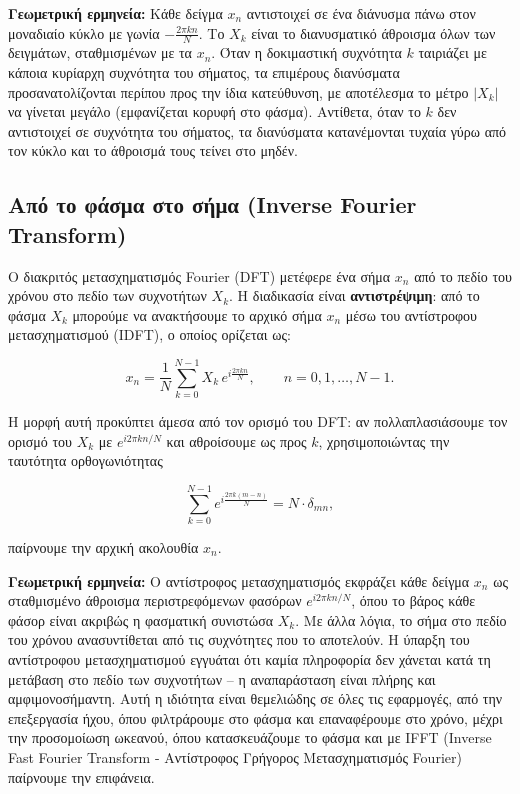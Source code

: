 \documentclass[a4paper, 11pt]{article}
\begin{document}
\textbf{Γεωμετρική ερμηνεία:} Κάθε δείγμα \(x_n\) αντιστοιχεί σε ένα
διάνυσμα πάνω στον μοναδιαίο κύκλο με γωνία \(-\frac{2\pi kn}{N}\). Το
\(X_k\) είναι το διανυσματικό άθροισμα όλων των δειγμάτων, σταθμισμένων
με τα \(x_n\). Όταν η δοκιμαστική συχνότητα \(k\) ταιριάζει με κάποια
κυρίαρχη συχνότητα του σήματος, τα επιμέρους διανύσματα
προσανατολίζονται περίπου προς την ίδια κατεύθυνση, με αποτέλεσμα το
μέτρο \(|X_k|\) να γίνεται μεγάλο (εμφανίζεται κορυφή στο φάσμα).
Αντίθετα, όταν το \(k\) δεν αντιστοιχεί σε συχνότητα του σήματος, τα
διανύσματα κατανέμονται τυχαία γύρω από τον κύκλο και το άθροισμά τους
τείνει στο μηδέν.

\subsection{Από το φάσμα στο σήμα (Inverse Fourier
Transform)}\label{ux3b1ux3c0ux3cc-ux3c4ux3bf-ux3c6ux3acux3c3ux3bcux3b1-ux3c3ux3c4ux3bf-ux3c3ux3aeux3bcux3b1-inverse-fourier-transform}

Ο διακριτός μετασχηματισμός Fourier (DFT) μετέφερε ένα σήμα \(x_n\) από
το πεδίο του χρόνου στο πεδίο των συχνοτήτων \(X_k\). Η διαδικασία είναι
\textbf{αντιστρέψιμη}: από το φάσμα \(X_k\) μπορούμε να ανακτήσουμε το
αρχικό σήμα \(x_n\) μέσω του αντίστροφου μετασχηματισμού (IDFT), ο
οποίος ορίζεται ως:

\[
x_n = \frac{1}{N} \sum_{k=0}^{N-1} X_k \, e^{i\frac{2\pi kn}{N}}, \qquad n = 0,1,\dots,N-1.
\]

Η μορφή αυτή προκύπτει άμεσα από τον ορισμό του DFT: αν πολλαπλασιάσουμε
τον ορισμό του \(X_k\) με \(e^{i2\pi kn/N}\) και αθροίσουμε ως προς
\(k\), χρησιμοποιώντας την ταυτότητα ορθογωνιότητας

\[
\sum_{k=0}^{N-1} e^{i\frac{2\pi k(m-n)}{N}} = N \cdot \delta_{mn},
\]

παίρνουμε την αρχική ακολουθία \(x_n\).

\textbf{Γεωμετρική ερμηνεία:} Ο αντίστροφος μετασχηματισμός εκφράζει
κάθε δείγμα \(x_n\) ως σταθμισμένο άθροισμα περιστρεφόμενων φασόρων
\(e^{i2\pi kn/N}\), όπου το βάρος κάθε φάσορ είναι ακριβώς η φασματική
συνιστώσα \(X_k\). Με άλλα λόγια, το σήμα στο πεδίο του χρόνου
ανασυντίθεται από τις συχνότητες που το αποτελούν. Η ύπαρξη του
αντίστροφου μετασχηματισμού εγγυάται ότι καμία πληροφορία δεν χάνεται
κατά τη μετάβαση στο πεδίο των συχνοτήτων -- η αναπαράσταση είναι πλήρης
και αμφιμονοσήμαντη. Αυτή η ιδιότητα είναι θεμελιώδης σε όλες τις
εφαρμογές, από την επεξεργασία ήχου, όπου φιλτράρουμε στο φάσμα και
επαναφέρουμε στο χρόνο, μέχρι την προσομοίωση ωκεανού, όπου
κατασκευάζουμε το φάσμα και με IFFT (Inverse Fast Fourier Transform -
Αντίστροφος Γρήγορος Μετασχηματισμός Fourier) παίρνουμε την επιφάνεια.
\end{document}
